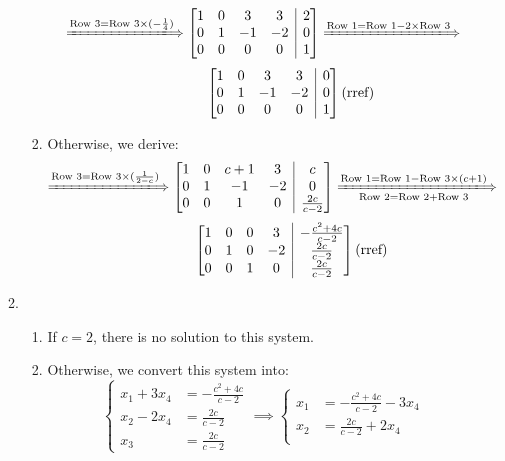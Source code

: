 \begin{enumerate}
\begin{enumerate}
\begin{enumerate}
\[
\xLongrightarrow{\text{Row 3}=\text{Row 3}\x(-\frac{1}{4})}
\left[\begin{array}{@{}cccc|c@{}}
1&0&3&3&2\\
0&1&-1&-2&0\\
0&0&0&0&1
\end{array}\right]
\xLongrightarrow{\text{Row 1}=\text{Row 1}-2\x\text{Row 3}}
\]
\[
\qquad\qquad\left[\begin{array}{@{}cccc|c@{}}
1&0&3&3&0\\
0&1&-1&-2&0\\
0&0&0&0&1
\end{array}\right]\text{(rref)}
\]
\item
Otherwise, we derive:
\[
\xLongrightarrow{\text{Row 3}=\text{Row 3}\x(\frac{1}{2-c})}
\left[\begin{array}{@{}cccc|c@{}}
1&0&c+1&3&c\\
0&1&-1&-2&0\\
0&0&1&0&\frac{2c}{c-2}
\end{array}\right]
\xLongrightarrow[\text{Row 2}=\text{Row 2}+\text{Row 3}]{\text{Row 1}=\text{Row 1}-\text{Row 3}\x(c+1)}
\]
\[
\qquad\qquad\left[\begin{array}{@{}cccc|c@{}}
1&0&0&3&-\frac{c^2+4c}{c-2}\\
0&1&0&-2&\frac{2c}{c-2}\\
0&0&1&0&\frac{2c}{c-2}
\end{array}\right](\text{rref})
\]
\end{enumerate}
\item
\begin{enumerate}
\item
If $c=2$, there is no solution to this system.
\item
Otherwise, we convert this system into:
\[
\left\{
\begin{aligned}
x_1+3x_4&=-\frac{c^2+4c}{c-2}\\
x_2-2x_4&=\frac{2c}{c-2}\\
x_3&=\frac{2c}{c-2}
\end{aligned}
\right.
\implies
\left\{
\begin{aligned}
x_1&=-\frac{c^2+4c}{c-2}-3x_4\\
x_2&=\frac{2c}{c-2}+2x_4\\

\end{aligned}\]
\end{enumerate}
\end{enumerate}
\end{enumerate}
